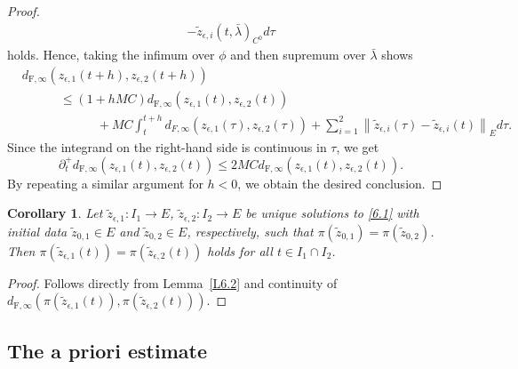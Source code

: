 \documentclass[reqno,centertags,12pt]{amsart}
\newtheorem{corollary}[theorem]{Corollary}
\theoremstyle{definition}
\numberwithin{equation}{section}
\newcommand{\norm}[1]{\left\|#1\right\|}
\begin{document}
\begin{proof}
\begin{align*}
{        - \tilde{z}_{\epsilon,i}(t,\bar{\lambda})}_{C^{0}}d\tau
    \end{align*}
    holds. Hence, taking the infimum over $\phi$ and then
    supremum over $\bar{\lambda}$ shows
    \begin{align*}
        &d_{\mathrm{F},\infty}\left(z_{\epsilon,1}(t+h),z_{\epsilon,2}(t+h)\right)
        \\&\quad\quad\quad
        \leq (1+hMC)
        d_{\mathrm{F},\infty}\left(z_{\epsilon,1}(t),z_{\epsilon,2}(t)\right)
        \\&\quad\quad\quad\quad\quad\quad
        + MC\int_{t}^{t+h}
        d_{F,\infty}(z_{\epsilon,1}(\tau),z_{\epsilon,2}(\tau))
        + \sum_{i=1}^{2}\norm{\tilde{z}_{\epsilon,i}(\tau)
        - \tilde{z}_{\epsilon,i}(t)}_{E}d\tau.
    \end{align*}
    Since the integrand on the right-hand side is continuous in $\tau$, we get
    \[
        \partial_{t}^{+}d_{\mathrm{F},\infty}\left(
            z_{\epsilon,1}(t),z_{\epsilon,2}(t)
        \right)
        \leq 2MC
        d_{\mathrm{F},\infty}\left(
            z_{\epsilon,1}(t),z_{\epsilon,2}(t)
        \right).
    \]
    By repeating a similar argument for $h<0$, we obtain the desired conclusion.
\end{proof}

\begin{corollary}\label{C6.3}
    Let $\tilde{z}_{\epsilon,1}\colon I_{1}\to E$,
    $\tilde{z}_{\epsilon,2}\colon I_{2}\to E$ be unique solutions to
    \eqref{6.1} with initial data
    $\tilde{z}_{0,1}\in E$ and $\tilde{z}_{0,2}\in E$, respectively,
    such that $\pi(\tilde{z}_{0,1}) = \pi(\tilde{z}_{0,2})$.
    Then $\pi(\tilde{z}_{\epsilon,1}(t)) = \pi(\tilde{z}_{\epsilon,2}(t))$
    holds for all $t\in I_{1}\cap I_{2}$.
\end{corollary}

\begin{proof}
    Follows directly from Lemma~\ref{L6.2}
    and continuity of $d_{\mathrm{F},\infty}(\pi(\tilde{z}_{\epsilon,1}(t)),
    \pi(\tilde{z}_{\epsilon,2}(t)))$.
\end{proof}


\subsection{The a priori estimate}
\end{document}
